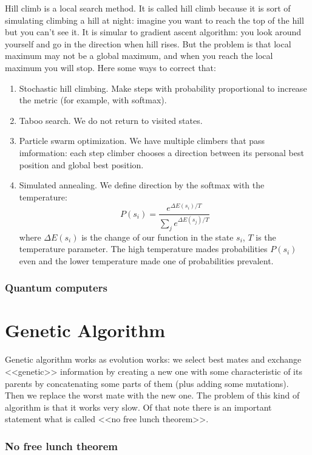 Hill climb is a local search method. It is called hill climb because it is sort of simulating climbing a hill at night: imagine you want to reach the top of the hill but you can't see it. It is simular to gradient ascent algorithm: you look around yourself and go in the direction when hill rises. But the problem is that local maximum may not be a global maximum, and when you reach the local maximum you will stop. Here some ways to correct that:
\begin{enumerate}[label=$\bullet$]
	\item {\sc Stochastic hill climbing.} Make steps with probability proportional to increase the metric (for example, with softmax).
	\item {\sc Taboo search.} We do not return to visited states.
	\item {\sc Particle swarm optimization.} We have multiple climbers that pass imformation: each step climber chooses a direction between its personal best position and global best position.
	\item {\sc Simulated annealing.} We define direction by the softmax with the temperature:
	$$P(s_i)=\frac{e^{\Delta E(s_i)/T}}{\sum\limits_{j} e^{\Delta E(s_j)/T}}$$
	where $\Delta E(s_i)$ is the change of our function in the state $s_i$, $T$ is the temperature parameter. The high temperature mades probabilities $P(s_i)$ even and the lower temperature made one of probabilities prevalent.
\end{enumerate}

\subsubsection*{Quantum computers}

{\it <Quantum computers find function optimum very fast>}

\section{Genetic Algorithm}

Genetic algorithm works as evolution works: we select best mates and exchange <<genetic>> information by creating a new one with some characteristic of its parents by concatenating some parts of them (plus adding some mutations). Then we replace the worst mate with the new one. The problem of this kind of algorithm is that it works very slow. Of that note there is an important statement what is called <<no free lunch theorem>>.

\subsubsection*{No free lunch theorem}

